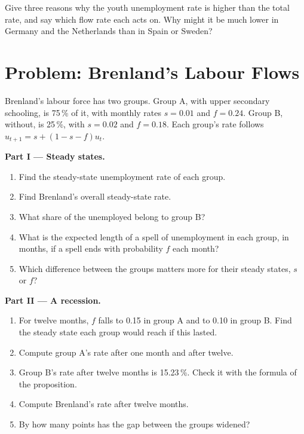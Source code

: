 \begin{exercise}[$\star\star\star$]\label{exo:g11:unemployment:15}
Give three reasons why the youth unemployment rate is higher than the total rate, and say which flow rate each acts on. Why might it be much lower in Germany and the
Netherlands than in Spain or Sweden?
\end{exercise}

\section{Problem: Brenland's Labour Flows}

\begin{problem}
\label{pb:g11:unemployment:1}
Brenland's labour force has two groups. Group A, with upper secondary schooling, is 75\,\% of it, with monthly rates $s = 0.01$ and $f = 0.24$. Group B, without, is 25\,\%,
with $s = 0.02$ and $f = 0.18$. Each group's rate follows $u_{t+1} = s + (1 - s - f)u_t$.

\medskip
\noindent\textbf{Part I --- Steady states.}
\begin{enumerate}
\item Find the steady-state unemployment rate of each group.
\item Find Brenland's overall steady-state rate.
\item What share of the unemployed belong to group B?
\item What is the expected length of a spell of unemployment in each group, in months, if a spell ends with probability $f$ each month?
\item Which difference between the groups matters more for their steady states, $s$ or $f$?
\end{enumerate}

\medskip
\noindent\textbf{Part II --- A recession.}
\begin{enumerate}[resume]
\item For twelve months, $f$ falls to 0.15 in group A and to 0.10 in group B. Find the steady state each group would reach if this lasted.
\item Compute group A's rate after one month and after twelve.
\item Group B's rate after twelve months is 15.23\,\%. Check it with the formula of the proposition.
\item Compute Brenland's rate after twelve months.
\item By how many points has the gap between the groups widened?
\end{enumerate}


\end{problem}

